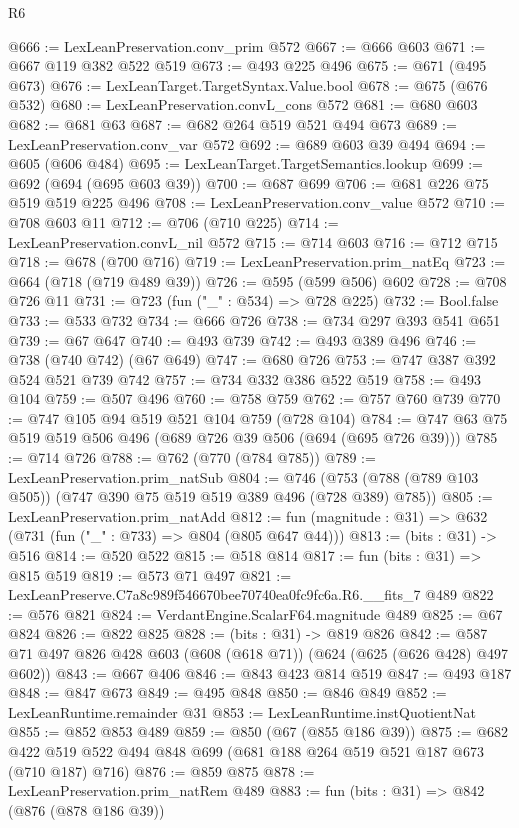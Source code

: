 \begin{lexlean}{R6}
\begin{coremodule}
@666 := LexLeanPreservation.conv_prim @572
@667 := @666 @603
@671 := @667 @119 @382 @522 @519
@673 := @493 @225 @496
@675 := @671 (@495 @673)
@676 := LexLeanTarget.TargetSyntax.Value.bool
@678 := @675 (@676 @532)
@680 := LexLeanPreservation.convL_cons @572
@681 := @680 @603
@682 := @681 @63
@687 := @682 @264 @519 @521 @494 @673
@689 := LexLeanPreservation.conv_var @572
@692 := @689 @603 @39 @494
@694 := @605 (@606 @484)
@695 := LexLeanTarget.TargetSemantics.lookup
@699 := @692 (@694 (@695 @603 @39))
@700 := @687 @699
@706 := @681 @226 @75 @519 @519 @225 @496
@708 := LexLeanPreservation.conv_value @572
@710 := @708 @603 @11
@712 := @706 (@710 @225)
@714 := LexLeanPreservation.convL_nil @572
@715 := @714 @603
@716 := @712 @715
@718 := @678 (@700 @716)
@719 := LexLeanPreservation.prim_natEq
@723 := @664 (@718 (@719 @489 @39))
@726 := @595 (@599 @506) @602
@728 := @708 @726 @11
@731 := @723 (fun ("_" : @534) => @728 @225)
@732 := Bool.false
@733 := @533 @732
@734 := @666 @726
@738 := @734 @297 @393 @541 @651
@739 := @67 @647
@740 := @493 @739
@742 := @493 @389 @496
@746 := @738 (@740 @742) (@67 @649)
@747 := @680 @726
@753 := @747 @387 @392 @524 @521 @739 @742
@757 := @734 @332 @386 @522 @519
@758 := @493 @104
@759 := @507 @496
@760 := @758 @759
@762 := @757 @760 @739
@770 := @747 @105 @94 @519 @521 @104 @759 (@728 @104)
@784 := @747 @63 @75 @519 @519 @506 @496 (@689 @726 @39 @506 (@694 (@695 @726 @39)))
@785 := @714 @726
@788 := @762 (@770 (@784 @785))
@789 := LexLeanPreservation.prim_natSub
@804 := @746 (@753 (@788 (@789 @103 @505)) (@747 @390 @75 @519 @519 @389 @496 (@728 @389) @785))
@805 := LexLeanPreservation.prim_natAdd
@812 := fun (magnitude : @31) => @632 (@731 (fun ("_" : @733) => @804 (@805 @647 @44)))
@813 := (bits : @31) -> @516
@814 := @520 @522
@815 := @518 @814
@817 := fun (bits : @31) => @815 @519
@819 := @573 @71 @497
@821 := LexLeanPreserve.C7a8c989f546670bee70740ea0fc9fc6a.R6.__fits_7 @489
@822 := @576 @821
@824 := VerdantEngine.ScalarF64.magnitude @489
@825 := @67 @824
@826 := @822 @825
@828 := (bits : @31) -> @819 @826
@842 := @587 @71 @497 @826 @428 @603 (@608 (@618 @71)) (@624 (@625 (@626 @428) @497 @602))
@843 := @667 @406
@846 := @843 @423 @814 @519
@847 := @493 @187
@848 := @847 @673
@849 := @495 @848
@850 := @846 @849
@852 := LexLeanRuntime.remainder @31
@853 := LexLeanRuntime.instQuotientNat
@855 := @852 @853 @489
@859 := @850 (@67 (@855 @186 @39))
@875 := @682 @422 @519 @522 @494 @848 @699 (@681 @188 @264 @519 @521 @187 @673 (@710 @187) @716)
@876 := @859 @875
@878 := LexLeanPreservation.prim_natRem @489
@883 := fun (bits : @31) => @842 (@876 (@878 @186 @39))

\end{coremodule}
\end{lexlean}

